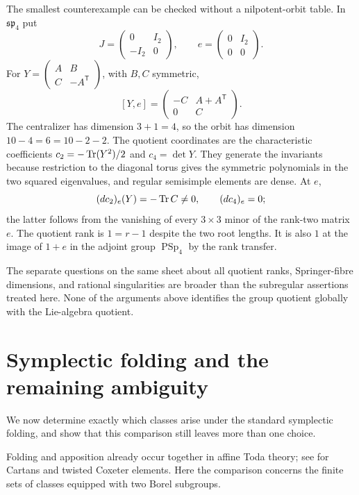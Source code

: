 \documentclass[11pt]{article}
\newcommand{\C}{\mathbf C}\newcommand{\Z}{\mathbf Z}\newcommand{\Q}{\mathbf Q}
\theoremstyle{definition}\newtheorem{definition}[theorem]{Definition}
\theoremstyle{remark}\newtheorem{remark}[theorem]{Remark}
\begin{document}
The smallest counterexample can be checked without a nilpotent-orbit table. In $\mathfrak{sp}_4$ put
\[
 J=\begin{pmatrix}0&I_2\\-I_2&0\end{pmatrix},\qquad
 e=\begin{pmatrix}0&I_2\\0&0\end{pmatrix}.
\]
For $Y=\left(\begin{smallmatrix}A&B\\C&-A^{\mathsf T}\end{smallmatrix}\right)$, with $B,C$ symmetric,
\[
 [Y,e]=\begin{pmatrix}-C&A+A^{\mathsf T}\\0&C\end{pmatrix}.
\]
The centralizer has dimension $3+1=4$, so the orbit has dimension $10-4=6=10-2-2$. The quotient coordinates are the characteristic coefficients $c_2=-\operatorname{Tr}(Y^2)/2$ and $c_4=\det Y$. They generate the invariants because restriction to the diagonal torus gives the symmetric polynomials in the two squared eigenvalues, and regular semisimple elements are dense. At $e$,
\[
 (dc_2)_e(Y)=-\operatorname{Tr} C\ne0,\qquad (dc_4)_e=0;
\]
the latter follows from the vanishing of every $3\times3$ minor of the rank-two matrix $e$. The quotient rank is $1=r-1$ despite the two root lengths. It is also $1$ at the image of $1+e$ in the adjoint group $\operatorname{PSp}_4$ by the rank transfer.

The separate questions on the same sheet about all quotient ranks, Springer-fibre dimensions, and rational singularities are broader than the subregular assertions treated here. None of the arguments above identifies the group quotient globally with the Lie-algebra quotient.

\section{Symplectic folding and the remaining ambiguity}\label{sec:folding}
We now determine exactly which classes arise under the standard symplectic folding, and show that this comparison still leaves more than one choice.

Folding and apposition already occur together in affine Toda theory; see \citet[Appendix~C.3--C.4, pp.~62--65]{DoreyPolvara2022} for Cartans and twisted Coxeter elements. Here the comparison concerns the finite sets of classes equipped with two Borel subgroups.
\end{document}
